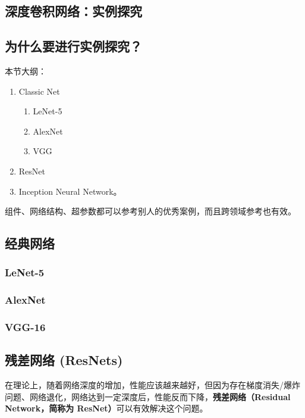 \documentclass[../../main.tex]{subfiles}
\begin{document}
\begin{refsection}
\chapter{深度卷积网络：实例探究}
\section{为什么要进行实例探究？}
\noindent 本节大纲：
\begin{enumerate}
    \item Classic Net
    \begin{enumerate}
        \item LeNet-5
        \item AlexNet
        \item VGG
    \end{enumerate}
    \item ResNet
    \item Inception Neural Network。
\end{enumerate}

组件、网络结构、超参数都可以参考别人的优秀案例，而且跨领域参考也有效。
\section{经典网络}

\subsection{LeNet-5}

\subsection{AlexNet}

\subsection{VGG-16}

\section{残差网络 (ResNets)\cite{arXiv:1512.03385}}
在理论上，随着网络深度的增加，性能应该越来越好，但因为存在梯度消失/爆炸问题、网络退化，网络达到一定深度后，性能反而下降，\textbf{残差网络（Residual Network，简称为 ResNet）}可以有效解决这个问题。


\end{refsection}
\end{document}
